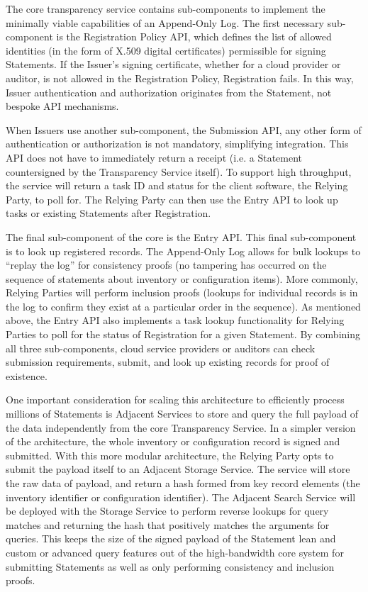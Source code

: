 \documentclass{jdf}
\begin{document}
The core transparency service contains sub-components to implement the minimally viable capabilities of an Append-Only Log. The first necessary sub-component is the Registration Policy API, which defines the list of allowed identities (in the form of X.509 digital certificates) permissible for signing Statements. If the Issuer's signing certificate, whether for a cloud provider or auditor, is not allowed in the Registration Policy, Registration fails. In this way, Issuer authentication and authorization originates from the Statement, not bespoke API mechanisms.

When Issuers use another sub-component, the Submission API, any other form of authentication or authorization is not mandatory, simplifying integration. This API does not have to immediately return a receipt (i.e. a Statement countersigned by the Transparency Service itself). To support high throughput, the service will return a task ID and status for the client software, the Relying Party, to poll for. The Relying Party can then use the Entry API to look up tasks or existing Statements after Registration. 

The final sub-component of the core is the Entry API. This final sub-component is to look up registered records. The Append-Only Log allows for bulk lookups to ``replay the log'' for consistency proofs (no tampering has occurred on the sequence of statements about inventory or configuration items). More commonly, Relying Parties will perform inclusion proofs (lookups for individual records is in the log to confirm they exist at a particular order in the sequence). As mentioned above, the Entry API also implements a task lookup functionality for Relying Parties to poll for the status of Registration for a given Statement. By combining all three sub-components, cloud service providers or auditors can check submission requirements, submit, and look up existing records for proof of existence.

One important consideration for scaling this architecture to efficiently process millions of Statements is Adjacent Services to store and query the full payload of the data independently from the core Transparency Service. In a simpler version of the architecture, the whole inventory or configuration record is signed and submitted. With this more modular architecture, the Relying Party opts to submit the payload itself to an Adjacent Storage Service. The service will store the raw data of payload, and return a hash formed from key record elements (the inventory identifier or configuration identifier). The Adjacent Search Service will be deployed with the Storage Service to perform reverse lookups for query matches and returning the hash that positively matches the arguments for queries. This keeps the size of the signed payload of the Statement lean and custom or advanced query features out of the high-bandwidth core system for submitting Statements as well as only performing consistency and inclusion proofs.
\end{document}
